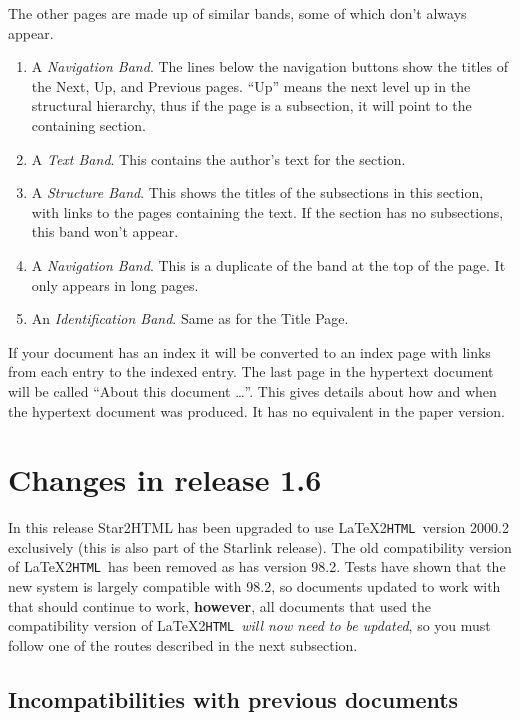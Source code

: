 \documentclass[twoside,11pt]{article}
\newcommand{\xlabel}[1]{}
\newcommand{\latextohtml}{\LaTeX2\texttt{HTML}}
\renewcommand{\_}{\texttt{\symbol{95}}}
\begin{document}
The other pages are made up of similar bands, some of which don't always
appear.

\begin{enumerate}
\item A \emph{Navigation Band}.
The lines below the navigation buttons show the titles of the Next, Up, and
Previous pages.
``Up'' means the next level up in the structural hierarchy, thus if the page is
a subsection, it will point to the containing section.
\item A \emph{Text Band}.
This contains the author's text for the section.
\item A \emph{Structure Band}.
This shows the titles of the subsections in this section, with links to the
pages containing the text.
If the section has no subsections, this band won't appear.
\item A \emph{Navigation Band}.
This is a duplicate of the band at the top of the page.
It only appears in long pages.
\item An \emph{Identification Band}.
 Same as for the Title Page.
\end{enumerate}

If your document has an index it will be converted to an index page with
links from each entry to the indexed entry.
The last page in the hypertext document will be called ``About this
document \ldots''.
This gives details about how and when the hypertext document was produced.
It has no equivalent in the paper version.

\newpage

\section{\xlabel{changes_in_this_release}\label{changes}Changes in release 1.6}
In this release Star2HTML has been upgraded to use \latextohtml\ version
2000.2 exclusively (this is also part of the Starlink release).  The old
compatibility version of \latextohtml\ has been removed as has version
98.2. Tests have shown that the new system is largely compatible with 98.2, so
documents updated to work with that should continue to work, \textbf{however},
all documents that used the compatibility version of \latextohtml\
\textit{will now need to be updated}, so you must follow one of the routes
described in the next subsection.

\subsection{Incompatibilities with previous documents}
\end{document}
